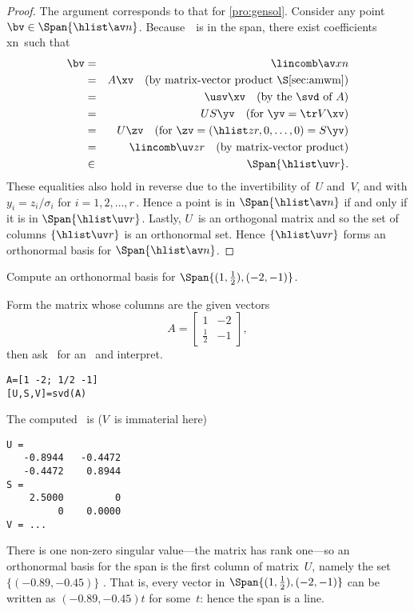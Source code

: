 \begin{proof} 
The argument corresponds to that for \autoref{pro:gensol}.
Consider any point \(\bv\in\Span\{\hlist\av n\}\).
Because~\bv\ is in the span, there exist coefficients \hlist xn\ such that
\begin{eqnarray*}
\bv&=&\lincomb \av xn
\\&=&A\xv \quad(\text{by matrix-vector product \S\ref{sec:amwm}})
\\&=&\usv \xv \quad(\text{by the \svd\ of }A)
\\&=&US \yv \quad(\text{for }\yv=\tr V\xv)
\\&=&U\zv \quad(\text{for }\zv=(\hlist zr,0,\ldots,0)=S\yv)
\\&=&\lincomb \uv z r  \quad(\text{by matrix-vector product})
\\&\in&\Span\{\hlist \uv r\}.
\end{eqnarray*}
These equalities also hold in reverse due to the invertibility of~\(U\) and~\(V\), and with \(y_i=z_i/\sigma_i\) for \(i=1,2,\ldots,r\)\,.
Hence a point is in \(\Span\{\hlist\av n\}\) if and only if it is in \(\Span\{\hlist \uv r\}\).
Lastly, \(U\)~is an orthogonal matrix and so the set of columns \(\{\hlist \uv r\}\) is an orthonormal set.
Hence \(\{\hlist \uv r\}\) forms an orthonormal basis for \(\Span\{\hlist\av n\}\).
\end{proof}


\begin{example} \label{eg:orthspn2}
Compute an orthonormal basis for \(\Span\{(1,\frac12),(-2,-1)\}\).
\begin{solution} 
Form the matrix whose columns are the given vectors
\begin{equation*}
A=\begin{bmatrix} 1&-2\\\frac12&-1 \end{bmatrix},
\end{equation*}
then ask \script\ for an \svd\ and interpret.
\begin{verbatim}
A=[1 -2; 1/2 -1]
[U,S,V]=svd(A)
\end{verbatim}
\setbox\ajrqrbox\hbox{}%
\marginpar{\usebox{\ajrqrbox}}%
The computed \svd\ is (\(V\)~is immaterial here)
\begin{verbatim}
U =
   -0.8944   -0.4472
   -0.4472    0.8944
S =
    2.5000         0
         0    0.0000
V = ...
\end{verbatim}
There is one non-zero singular value---the matrix has rank one---so an orthonormal basis for the span is the first column of matrix~\(U\), namely the set \(\{(-0.89,-0.45)\}\) \twodp.
That is, every vector in \(\Span\{(1,\frac12),(-2,-1)\}\) can be written as \((-0.89,-0.45)t\) for some~\(t\): hence the span is a line.
\end{solution}
\end{example}


